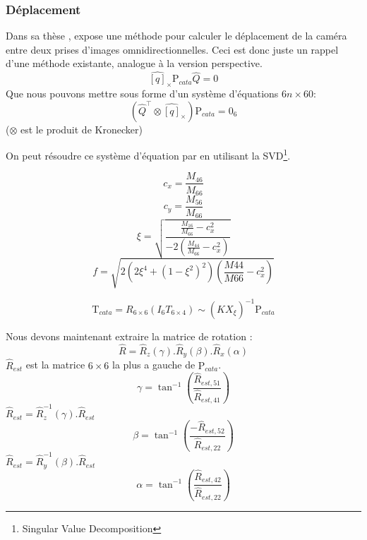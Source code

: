 \subsubsection{Déplacement}

Dans sa thèse \cite{Puig11PhD}, \citeauthor{Puig11PhD} expose une méthode pour calculer le déplacement de la caméra entre deux prises d'images omnidirectionnelles.
Ceci est donc juste un rappel d'une méthode existante, analogue à la version perspective.
\begin{equation}
\widehat{[q]}_\times \text{P}_{cata} \hat{Q} = 0
\end{equation}
Que nous pouvons mettre sous forme d'un système d'équations $6n\times60$:
\begin{equation}
\left( \hat{Q}^{\top} \otimes \widehat{[q]}_\times \right) \text{P}_{cata}  = 0_6
\end{equation}
($\otimes$ est le produit de Kronecker)

On peut résoudre ce système d'équation par  en utilisant la SVD\footnote{Singular Value Decomposition}.

\begin{equation}
c_x = \frac{M_{46}}{M_{66}}
\end{equation}
\begin{equation}
c_y = \frac{M_{56}}{M_{66}}
\end{equation}
\begin{equation}
\xi = \sqrt{\frac{\frac{M_{16}}{M_{66}}-c_x^2}{-2\left( \frac{M_{44}}{M_{66}}-c_x^2 \right)}}
\end{equation}
\begin{equation}
f = \sqrt{2\left(2\xi^4 + \left(1-\xi^2\right)^2\right)\left(\frac{M44}{M66}-c_x^2\right)}
\end{equation}

\begin{equation}
\text{T}_{cata} = R_{6\times6} \left(I_6 T_{6\times4} \right) \sim (\hat{K}X_\xi )^{-1} \text{P}_{cata}
\end{equation}

Nous devons maintenant extraire la matrice de rotation :
\begin{equation}
\hat{R} = \hat{R}_z(\gamma).\hat{R}_y(\beta).\hat{R}_x(\alpha)
\end{equation}
$\hat{R}_{est}$ est la matrice $6\times6$ la plus a gauche de $\text{P}_{cata}$.
\begin{equation}
\gamma = \tan^{-1}\left(\frac{\hat{R}_{est,51}}{\hat{R}_{est,41}}\right)
\end{equation}
$\hat{R}_{est} = \hat{R}_z^{-1}(\gamma).\hat{R}_{est}$
\begin{equation}
\beta = \tan^{-1}\left(\frac{-\hat{R}_{est,52}}{\hat{R}_{est,22}}\right)
\end{equation}
$\hat{R}_{est} = \hat{R}_y^{-1}(\beta).\hat{R}_{est}$
\begin{equation}
\alpha = \tan^{-1}\left(\frac{\hat{R}_{est,42}}{\hat{R}_{est,22}}\right)
\end{equation}


